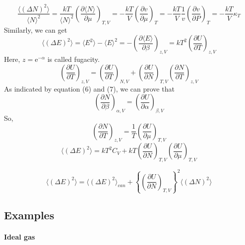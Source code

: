 \documentclass{article}
\begin{document}
\begin{equation}
\frac{\langle (\Delta N)^2 \rangle}{\langle N \rangle ^2} = \frac{kT}{\langle N \rangle ^2} \left(\frac{\partial \langle N \rangle}{\partial \mu}\right)_{T,V} = -\frac{kT}{V} \left(\frac{\partial v}{\partial \mu}\right)_{T}= -\frac{kT}{V} \frac{1}{v}  \left(\frac{\partial v}{\partial P}\right)_{T} =
-\frac{kT}{V} \kappa_{T}
\end{equation}
Similarly, we can get 
\begin{equation}
\langle (\Delta E)^2 \rangle = \langle E^2 \rangle - \langle E \rangle ^2 = - \left(\frac{\partial \langle E \rangle}{\partial \beta}\right)_{z,V}=kT^2 \left(\frac{\partial U}{\partial T}\right)_{z,V}
\end{equation}
Here, $z=\mathrm{e}^{-\alpha}$ is called fugacity.
\begin{equation}
\left(\frac{\partial U}{\partial T}\right)_{z,V} = \left( \frac{\partial U}{\partial T}\right)_{N,V}
+ \left( \frac{\partial U}{\partial N}\right)_{T,V}\left(\frac{\partial N}{\partial T}\right)_{z,V} 
\end{equation}
As indicated by equation (6) and (7), we can prove that 
\begin{equation}
\left(\frac{\partial N}{\partial \beta}\right)_{\alpha,V} =\left(\frac{\partial U}{\partial \alpha}\right)_{\beta,V}
 \end{equation} 
So, 
\begin{equation}
\left(\frac{\partial N}{\partial T}\right)_{z,V} =\frac{1}{T} \left(\frac{\partial U}{\partial \mu}\right)_{T,V}
\end{equation}
\begin{equation}
\langle (\Delta E)^2 \rangle = kT^2C_V + kT \left(\frac{\partial U}{\partial N}\right)_{T,V} \left(\frac{\partial U}{\partial \mu}\right)_{T,V}
\end{equation}

\begin{equation}
\langle (\Delta E)^2 \rangle  = \langle (\Delta E)^2 \rangle_{can} + \left \{\left(\frac{\partial U}{\partial N}\right)_{T,V} \right\}^2  \langle (\Delta N)^2 \rangle
\end{equation}

\subsection{Examples}
\paragraph{Ideal gas}
\end{document}
